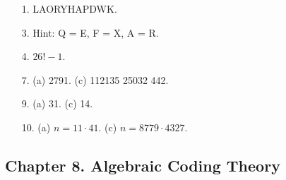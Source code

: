 {\small
\begin{itemize}
 
 
\item[1.]
LAORYHAPDWK.
 
 
\item[3.]
Hint: Q = E, F = X, A = R. 
 
\item[4.]
$26! -1$.
 
\item[7.]
(a)  2791.
(c)  112135 25032 442.
 
\item[9.]
(a) 31.
(c) 14.
 
 
 
\item[10.]
(a) $n = 11 \cdot 41$.
(c) $n = 8779 \cdot 4327$.
 
 
\end{itemize}
}
 
\subsection*{Chapter 8. Algebraic Coding Theory}
 
